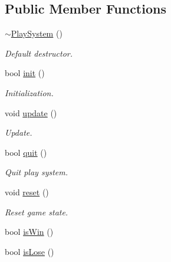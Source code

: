 \subsection*{Public Member Functions}
\begin{DoxyCompactItemize}
\item 
\mbox{\label{class_play_system_a615cfdd32a692d905aae334657180ae1}} 
\mbox{\hyperlink{class_play_system_a615cfdd32a692d905aae334657180ae1}{$\sim$\+Play\+System}} ()
\begin{DoxyCompactList}\small\item\em Default destructor. \end{DoxyCompactList}\item 
\mbox{\label{class_play_system_a6174f6f5609e2c215e72b059ed5c3a32}} 
bool \mbox{\hyperlink{class_play_system_a6174f6f5609e2c215e72b059ed5c3a32}{init}} ()
\begin{DoxyCompactList}\small\item\em Initialization. \end{DoxyCompactList}\item 
\mbox{\label{class_play_system_a6c4d3a6a05a24f9a1f18842dbb3b52b1}} 
void \mbox{\hyperlink{class_play_system_a6c4d3a6a05a24f9a1f18842dbb3b52b1}{update}} ()
\begin{DoxyCompactList}\small\item\em Update. \end{DoxyCompactList}\item 
\mbox{\label{class_play_system_a539276d9198c5dd754ee85d4a60a838f}} 
bool \mbox{\hyperlink{class_play_system_a539276d9198c5dd754ee85d4a60a838f}{quit}} ()
\begin{DoxyCompactList}\small\item\em Quit play system. \end{DoxyCompactList}\item 
\mbox{\label{class_play_system_ae6f2d7602c0576b40c5a75f55f671aea}} 
void \mbox{\hyperlink{class_play_system_ae6f2d7602c0576b40c5a75f55f671aea}{reset}} ()
\begin{DoxyCompactList}\small\item\em Reset game state. \end{DoxyCompactList}\item 
bool \mbox{\hyperlink{class_play_system_aa3fb93111ca2ba8eb493f186ae113587}{is\+Win}} ()
\item 
bool \mbox{\hyperlink{class_play_system_a8af443fab3bc9fc40f061addfea4e8b0}{is\+Lose}} ()
\end{DoxyCompactItemize}

